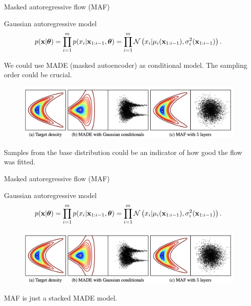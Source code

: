 \begin{frame}{Masked autoregressive flow (MAF)}
	\begin{block}{Gaussian autoregressive model}
		\vspace{-0.5cm}
		\[
		p(\mathbf{x} | \boldsymbol{\theta}) = \prod_{i=1}^m p(x_i | \mathbf{x}_{1:i - 1}, \boldsymbol{\theta}) = \prod_{i=1}^m \mathcal{N} \left(x_i | \mu_i(\mathbf{x}_{1:i-1}), \sigma^2_i (\mathbf{x}_{1:i-1})\right).
		\]
		\vspace{-0.5cm}
	\end{block}
	We could use MADE (masked autoencoder) as conditional model. The sampling order could be crucial.
	\begin{figure}
		\includegraphics[width=\linewidth]{figs/maf1.png}
	\end{figure}
	Samples from the base distribution could be an indicator of how good the flow was fitted. \\
\end{frame}
\begin{frame}{Masked autoregressive flow (MAF)}
	\begin{block}{Gaussian autoregressive model}
		\vspace{-0.5cm}
		\[
		p(\mathbf{x} | \boldsymbol{\theta}) = \prod_{i=1}^m p(x_i | \mathbf{x}_{1:i - 1}, \boldsymbol{\theta}) = \prod_{i=1}^m \mathcal{N} \left(x_i | \mu_i(\mathbf{x}_{1:i-1}), \sigma^2_i (\mathbf{x}_{1:i-1})\right).
		\]
		\vspace{-0.5cm}
	\end{block}
	\begin{figure}
		\includegraphics[width=\linewidth]{figs/maf1.png}
	\end{figure}
	MAF is just a stacked MADE model.
\end{frame}
